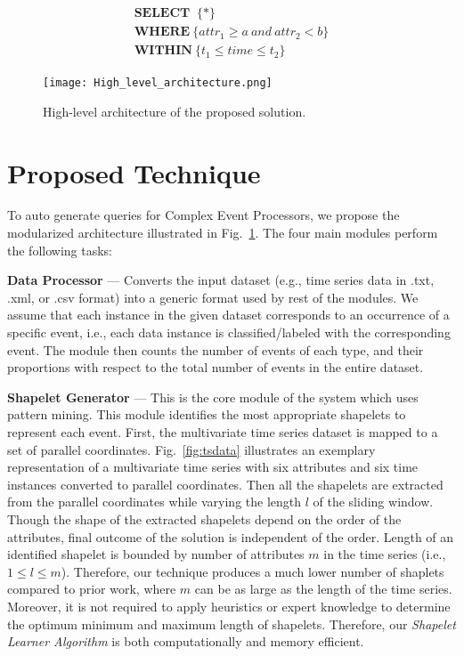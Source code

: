 \documentclass[conference]{IEEEtran}  %
\begin{document}
\begin{equation}
\begin{split}
\textbf{SELECT }\ \{*\} \\ \textbf{WHERE}\ \{attr_1\geq a\ and \ attr_2<b\} \\ \textbf{WITHIN}\ \{t_1\leq time\leq t_2\}
\label{eq:query}
\end{split}
\end{equation}

\begin{figure}
\texttt{[image: High\_level\_architecture.png]}
\caption{High-level architecture of the proposed solution.}
\label{fig:archi}
\end{figure}

\section{Proposed Technique}
To auto generate queries for Complex Event Processors, we propose the modularized architecture illustrated in Fig.~\ref{fig:archi}. The four main modules perform the following tasks:

\textbf{Data Processor} --- Converts the input dataset (e.g., time series data in .txt, .xml, or .csv format) into a generic format used by rest of the modules. We assume that each instance in the given dataset corresponds to an occurrence of a specific event, i.e., each data instance is classified/labeled with the corresponding event. The module then counts the number of events of each type, and their proportions with respect to the total number of events in the entire dataset.

\textbf{Shapelet Generator}	--- This is the core module of the system which uses pattern mining. This module identifies the most appropriate shapelets to represent each event. First, the multivariate time series dataset is mapped to a set of parallel coordinates. Fig.~\ref{fig:tsdata} illustrates an exemplary representation of a multivariate time series with six attributes and six time instances converted to parallel coordinates. Then all the shapelets are extracted from the parallel coordinates while varying the length $l$ of the sliding window. Though the shape of the extracted shapelets depend on the order of the attributes, final outcome of the solution is independent of the order. Length of an identified shapelet is bounded by number of attributes $m$ in the time series (i.e., $1 \leq l \leq m$). Therefore, our technique produces a much lower number of shaplets compared to prior work, where $m$ can be as large as the length of the time series. Moreover, it is not required to apply heuristics or expert knowledge to determine the optimum minimum and maximum length of shapelets. Therefore, our \textit{Shapelet Learner Algorithm} is both computationally and memory efficient.
\end{document}
